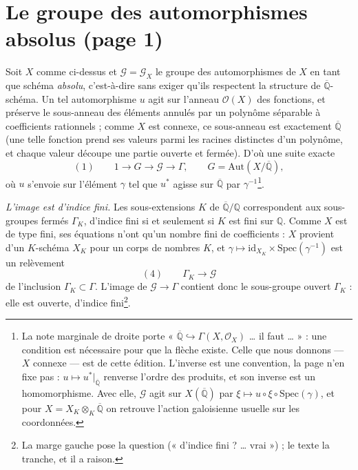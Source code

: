 \documentclass[11pt,a4paper]{article}
\begin{document}
\section*{Le groupe des automorphismes absolus (page 1)}

Soit $X$ comme ci-dessus et $\mathcal{G} = \mathcal{G}_X$ le groupe des
automorphismes de $X$ en tant que schéma \emph{absolu}, c'est-à-dire sans
exiger qu'ils respectent la structure de $\overline{\mathbb{Q}}$-schéma. Un tel
automorphisme $u$ agit sur l'anneau $\mathcal{O}(X)$ des fonctions, et
préserve le sous-anneau des éléments annulés par un polynôme séparable à
coefficients rationnels ; comme $X$ est connexe, ce sous-anneau est
exactement $\overline{\mathbb{Q}}$ (une telle fonction prend ses valeurs parmi
les racines distinctes d'un polynôme, et chaque valeur découpe une partie
ouverte et fermée). D'où une suite exacte
\[
(1)\qquad 1 \longrightarrow G \longrightarrow \mathcal{G} \longrightarrow
\Gamma, \qquad G = \mathrm{Aut}(X/\overline{\mathbb{Q}}),
\]
où $u$ s'envoie sur l'élément $\gamma$ tel que $u^{*}$ agisse sur
$\overline{\mathbb{Q}}$ par $\gamma^{-1}$\footnote{La note marginale de droite
porte « $\overline{\mathbb{Q}} \hookrightarrow \Gamma(X, \mathcal{O}_X)$ … il
faut … » : une condition est nécessaire pour que la flèche existe. Celle que
nous donnons — $X$ connexe — est de cette édition. L'inverse est une
convention, la page n'en fixe pas : $u \mapsto u^{*}|_{\overline{\mathbb{Q}}}$
renverse l'ordre des produits, et son inverse est un homomorphisme. Avec elle,
$\mathcal{G}$ agit sur $X(\overline{\mathbb{Q}})$ par $\xi \mapsto u \circ \xi
\circ \mathrm{Spec}(\gamma)$, et pour $X = X_K \otimes_K \overline{\mathbb{Q}}$
on retrouve l'action galoisienne usuelle sur les coordonnées.}.

\emph{L'image est d'indice fini.} Les sous-extensions $K$ de
$\overline{\mathbb{Q}}/\mathbb{Q}$ correspondent aux sous-groupes fermés
$\Gamma_K$, d'indice fini si et seulement si $K$ est fini sur $\mathbb{Q}$.
Comme $X$ est de type fini, ses équations n'ont qu'un nombre fini de
coefficients : $X$ provient d'un $K$-schéma $X_K$ pour un corps de nombres
$K$, et $\gamma \mapsto \mathrm{id}_{X_K} \times \mathrm{Spec}(\gamma^{-1})$
est un relèvement
\[
(4)\qquad \Gamma_K \longrightarrow \mathcal{G}
\]
de l'inclusion $\Gamma_K \subset \Gamma$. L'image de $\mathcal{G} \to \Gamma$
contient donc le sous-groupe ouvert $\Gamma_K$ : elle est ouverte, d'indice
fini\footnote{La marge gauche pose la question (« d'indice fini ? … vrai ») ;
le texte la tranche, et il a raison.}.
\end{document}
